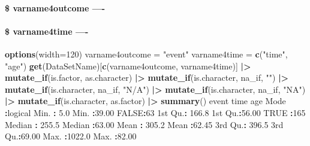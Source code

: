 \documentclass[
]{article}
\newenvironment{Shaded}{\begin{snugshade}}{\end{snugshade}}
\newcommand{\AttributeTok}[1]{\textcolor[rgb]{0.13,0.29,0.53}{#1}}
\newcommand{\ConstantTok}[1]{\textcolor[rgb]{0.56,0.35,0.01}{#1}}
\newcommand{\DecValTok}[1]{\textcolor[rgb]{0.00,0.00,0.81}{#1}}
\newcommand{\FloatTok}[1]{\textcolor[rgb]{0.00,0.00,0.81}{#1}}
\newcommand{\FunctionTok}[1]{\textcolor[rgb]{0.13,0.29,0.53}{\textbf{#1}}}
\newcommand{\NormalTok}[1]{#1}
\newcommand{\OtherTok}[1]{\textcolor[rgb]{0.56,0.35,0.01}{#1}}
\newcommand{\SpecialCharTok}[1]{\textcolor[rgb]{0.81,0.36,0.00}{\textbf{#1}}}
\newcommand{\StringTok}[1]{\textcolor[rgb]{0.31,0.60,0.02}{#1}}
\begin{document}
\hypertarget{varname4outcome--}{%
\paragraph{\$ varname4outcome ----}\label{varname4outcome--}}

\hypertarget{varname4time--}{%
\paragraph{\$ varname4time ----}\label{varname4time--}}

\begin{Shaded}
\begin{Highlighting}[]
\FunctionTok{options}\NormalTok{(}\AttributeTok{width=}\DecValTok{120}\NormalTok{)}
\NormalTok{varname4outcome }\OtherTok{=} \StringTok{"event"}
\NormalTok{varname4time }\OtherTok{=} \FunctionTok{c}\NormalTok{(}\StringTok{"time"}\NormalTok{, }\StringTok{"age"}\NormalTok{)}
\FunctionTok{get}\NormalTok{(DataSetName)[}\FunctionTok{c}\NormalTok{(varname4outcome, varname4time)] }\SpecialCharTok{|\textgreater{}} 
    \FunctionTok{mutate\_if}\NormalTok{(is.factor, as.character) }\SpecialCharTok{|\textgreater{}}  
    \FunctionTok{mutate\_if}\NormalTok{(is.character, na\_if, }\StringTok{""}\NormalTok{) }\SpecialCharTok{|\textgreater{}} \FunctionTok{mutate\_if}\NormalTok{(is.character, na\_if, }\StringTok{"N/A"}\NormalTok{) }\SpecialCharTok{|\textgreater{}} \FunctionTok{mutate\_if}\NormalTok{(is.character, na\_if, }\StringTok{"NA"}\NormalTok{) }\SpecialCharTok{|\textgreater{}} 
    \FunctionTok{mutate\_if}\NormalTok{(is.character, as.factor) }\SpecialCharTok{|\textgreater{}} 
    \FunctionTok{summary}\NormalTok{()}
\NormalTok{   event              time             age       }
\NormalTok{ Mode }\SpecialCharTok{:}\NormalTok{logical   Min.   }\SpecialCharTok{:}   \FloatTok{5.0}\NormalTok{   Min.   }\SpecialCharTok{:}\FloatTok{39.00}  
 \ConstantTok{FALSE}\SpecialCharTok{:}\DecValTok{63}\NormalTok{        1st Qu.}\SpecialCharTok{:} \FloatTok{166.8}\NormalTok{   1st Qu.}\SpecialCharTok{:}\FloatTok{56.00}  
 \ConstantTok{TRUE} \SpecialCharTok{:}\DecValTok{165}\NormalTok{       Median }\SpecialCharTok{:} \FloatTok{255.5}\NormalTok{   Median }\SpecialCharTok{:}\FloatTok{63.00}  
\NormalTok{                 Mean   }\SpecialCharTok{:} \FloatTok{305.2}\NormalTok{   Mean   }\SpecialCharTok{:}\FloatTok{62.45}  
\NormalTok{                 3rd Qu.}\SpecialCharTok{:} \FloatTok{396.5}\NormalTok{   3rd Qu.}\SpecialCharTok{:}\FloatTok{69.00}  
\NormalTok{                 Max.   }\SpecialCharTok{:}\FloatTok{1022.0}\NormalTok{   Max.   }\SpecialCharTok{:}\FloatTok{82.00}  
\end{Highlighting}
\end{Shaded}
\end{document}
